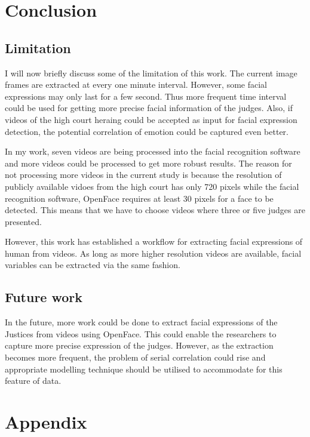 \documentclass{monashthesis}
\begin{document}
\hypertarget{conclusion}{%
\chapter{Conclusion}\label{conclusion}}

\hypertarget{limitation}{%
\section{Limitation}\label{limitation}}

I will now briefly discuss some of the limitation of this work. The current image frames are extracted at every one minute interval. However, some facial expressions may only last for a few second. Thus more frequent time interval could be used for getting more precise facial information of the judges. Also, if videos of the high court heraing could be accepted as input for facial expression detection, the potential correlation of emotion could be captured even better.

In my work, seven videos are being processed into the facial recognition software and more videos could be processed to get more robust results. The reason for not processing more videos in the current study is because the resolution of publicly available vidoes from the high court has only 720 pixels while the facial recognition software, OpenFace requires at least 30 pixels for a face to be detected. This means that we have to choose videos where three or five judges are presented.

However, this work has established a workflow for extracting facial expressions of human from videos. As long as more higher resolution videos are available, facial variables can be extracted via the same fashion.

\hypertarget{future-work}{%
\section{Future work}\label{future-work}}

In the future, more work could be done to extract facial expressions of the Justices from videos using OpenFace. This could enable the researchers to capture more precise expression of the judges. However, as the extraction becomes more frequent, the problem of serial correlation could rise and appropriate modelling technique should be utilised to accommodate for this feature of data.

\appendix

\hypertarget{appendix}{%
\chapter{Appendix}\label{appendix}}
\end{document}
